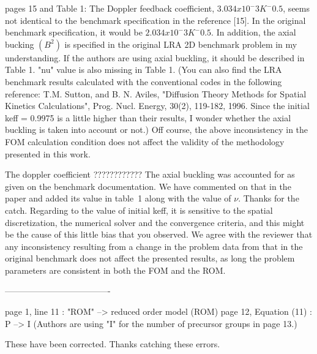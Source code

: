 \documentclass[10pt]{article}
\begin{document}
\begin{response}
{ pages 15 and Table 1:
	The Doppler feedback coefficient, $3.034x10^-3 K^-0.5$, seems not identical to the benchmark specification in the reference [15]. In the original benchmark specification, it would be $2.034x10^-3 K^-0.5$.
	In addition, the axial bucking $(B^2)$ is specified in the original LRA 2D benchmark problem in my understanding. If the authors are using axial buckling, it should be described in Table 1. "nu" value is also missing in Table 1.
	(You can also find the LRA benchmark results calculated with the conventional codes in the following reference:
	T.M. Sutton, and B. N. Aviles, "Diffusion Theory Methods for Spatial Kinetics Calculations", Prog. Nucl. Energy, 30(2), 119-182, 1996.
	Since the initial keff = 0.9975 is a little higher than their results, I wonder whether the axial buckling is taken into account or not.)
	Off course, the above inconsistency in the FOM calculation condition does not affect the validity of the methodology presented in this work.}


The doppler coefficient ????????????
The axial buckling was accounted for as given on the benchmark documentation. We have commented on that in the paper and added its value in table~1 along with the value of $\nu$. Thanks for the catch.
Regarding to the value of initial keff, it is sensitive to the spatial discretization, the numerical solver and the convergence criteria, and this might be the cause of this little bias that you observed.
We agree with the reviewer that any inconsistency resulting from a change in the problem data from that in the original benchmark does not affect the presented results, as long the problem parameters are consistent in both the FOM and the ROM. 


-------------------------------------
\end{response}

\begin{response}
{
 page 1, line 11 : "ROM" --> reduced order model (ROM)
 page 12, Equation (11) : P --> I (Authors are using "I" for the number of precursor groups in page 13.)}

\end{response}
These have been corrected. Thanks catching these errors.
\end{document}
